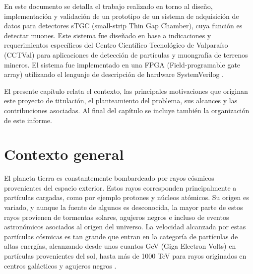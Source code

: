 En este documento se detalla el trabajo realizado en torno al diseño, implementación y validación de un prototipo de un sistema de adquisición de datos para detectores sTGC (small-strip Thin Gap Chamber), cuya función es detectar muones. Este sistema fue diseñado en base a indicaciones y requerimientos específicos del Centro Científico Tecnológico de Valparaíso (CCTVal) para aplicaciones de detección de partículas y muongrafía de terrenos mineros. El sistema fue implementado en una FPGA (Field-programable gate array) utilizando el lenguaje de descripción de hardware SystemVerilog .

El presente capítulo relata el contexto, las principales motivaciones que originan este proyecto de titulación, el planteamiento del problema, sus alcances y las contribuciones asociadas. Al final del capítulo se incluye también la organización de este informe.

\section{Contexto general}


El planeta tierra es constantemente bombardeado por rayos cósmicos provenientes del espacio exterior. Estos  rayos corresponden principalmente a partículas cargadas, como por ejemplo protones y núcleos atómicos. Su  origen es variado, y aunque la fuente de algunos es desconocida, la mayor parte de estos rayos provienen de tormentas solares, agujeros negros e incluso de eventos astronómicos asociados al origen del universo\cite{DeUndergraduatePhysics}. La velocidad alcanzada por estas partículas cósmicas es tan grande que entran en la categoría de partículas de altas energías, alcanzando desde unos cuantos GeV (Giga Electron Volts) en partículas provenientes del sol, hasta más de 1000 TeV para rayos originados en centros galácticos y agujeros negros .
	
